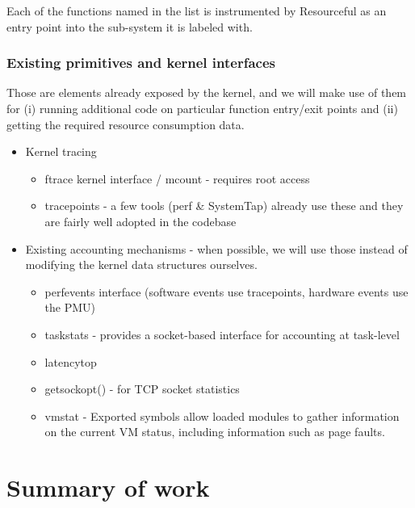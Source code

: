 \documentclass[12pt]{article}
\def\_{\textunderscore\-}
\begin{document}
  Each of the functions named in the list is instrumented by Resourceful as an entry point into the sub-system it is labeled with.
  
  \subsubsection{Existing primitives and kernel interfaces}\label{existingkernel}
  Those are elements already exposed by the kernel, and we will make use of them for (i) running additional code on particular function entry/exit points and (ii) getting the required resource consumption data.
  
  \begin{itemize}
  \item Kernel tracing
  	\begin{itemize}
  	\item ftrace kernel interface / mcount - requires root access
  	\item tracepoints - a few tools (perf \& SystemTap) already use these and they are fairly well adopted in the codebase
  	\end{itemize}
  \item Existing accounting mechanisms - when possible, we will use those instead of modifying the kernel data structures ourselves.
  	\begin{itemize}
  	\item perf\_events interface (software events use tracepoints, hardware events use the PMU)
  	\item taskstats \cite{taskstats} - provides a socket-based interface for accounting at task-level
  	\item latencytop \cite{latencytop}
  	\item getsockopt() - for TCP socket statistics
  	\item vmstat - Exported symbols allow loaded modules to gather information on the current VM status, including information such as page faults.
  	\end{itemize}
  \end{itemize}

  \section{Summary of work}
\end{document}
